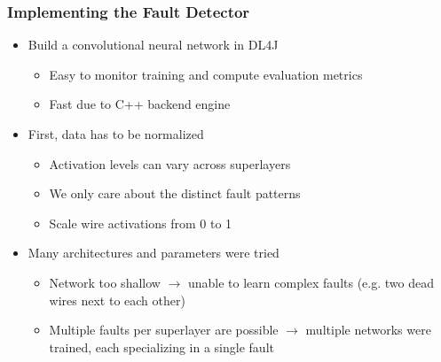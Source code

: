 \begin{frame}
  \frametitle{Implementing the Fault Detector}
  \begin{itemize}
    \item Build a convolutional neural network in DL4J
      \begin{itemize}
        \item Easy to monitor training and compute evaluation metrics
        \item Fast due to C++ backend engine
      \end{itemize}
    \item First, data has to be normalized
      \begin{itemize}
        \item Activation levels can vary across superlayers
        \item We only care about the distinct fault patterns
        \item Scale wire activations from 0 to 1
      \end{itemize}
    \item Many architectures and parameters were tried
      \begin{itemize}
        \item Network too shallow \(\rightarrow\) unable to learn
          complex faults (e.g. two dead wires next to each other)
        \item Multiple faults per superlayer are possible
          \(\rightarrow\) multiple networks were trained, each
          specializing in a single fault
      \end{itemize}
  \end{itemize}
\end{frame}

